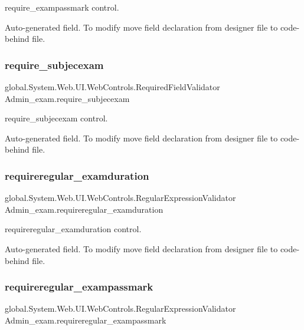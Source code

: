 require\+\_\+exampassmark control. 

Auto-\/generated field. To modify move field declaration from designer file to code-\/behind file. \mbox{\label{class_admin__exam_af92123406142c5433f3e74c11927061d}} 
\subsubsection{\texorpdfstring{require\_subjecexam}{require\_subjecexam}}
{\footnotesize\ttfamily global.\+System.\+Web.\+U\+I.\+Web\+Controls.\+Required\+Field\+Validator Admin\+\_\+exam.\+require\+\_\+subjecexam\hspace{0.3cm}{\ttfamily [protected]}}



require\+\_\+subjecexam control. 

Auto-\/generated field. To modify move field declaration from designer file to code-\/behind file. \mbox{\label{class_admin__exam_a6f0c2fda924ac5d196aed5c8ca205885}} 
\subsubsection{\texorpdfstring{requireregular\_examduration}{requireregular\_examduration}}
{\footnotesize\ttfamily global.\+System.\+Web.\+U\+I.\+Web\+Controls.\+Regular\+Expression\+Validator Admin\+\_\+exam.\+requireregular\+\_\+examduration\hspace{0.3cm}{\ttfamily [protected]}}



requireregular\+\_\+examduration control. 

Auto-\/generated field. To modify move field declaration from designer file to code-\/behind file. \mbox{\label{class_admin__exam_a7d0e4ac0336be98c1b2678128b1e2ee2}} 
\subsubsection{\texorpdfstring{requireregular\_exampassmark}{requireregular\_exampassmark}}
{\footnotesize\ttfamily global.\+System.\+Web.\+U\+I.\+Web\+Controls.\+Regular\+Expression\+Validator Admin\+\_\+exam.\+requireregular\+\_\+exampassmark\hspace{0.3cm}{\ttfamily [protected]}}



